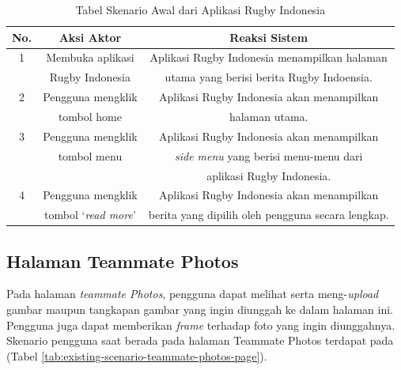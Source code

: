 \begin{table} [!h]
    \centering
    \caption{Tabel Skenario Awal dari Aplikasi Rugby Indonesia}
    \begin{tabular}{|c|c|c|}
    \hline
       No. & Aksi Aktor & Reaksi Sistem  \\ \hline
        1 & Membuka aplikasi & Aplikasi Rugby Indonesia menampilkan halaman \\
         & Rugby Indonesia & utama yang berisi berita Rugby Indoensia. \\ \hline
        2 & Pengguna mengklik & Aplikasi Rugby Indonesia akan menampilkan \\ 
         & tombol home &  halaman utama. \\ \hline
        3 & Pengguna mengklik & Aplikasi Rugby Indonesia akan menampilkan \\ 
         & tombol menu &  \textit{side menu} yang berisi menu-menu dari \\ 
         & &  aplikasi Rugby Indonesia. \\ \hline
        4 & Pengguna mengklik & Aplikasi Rugby Indonesia akan menampilkan \\
          & tombol `\textit{read more}' & berita yang dipilih oleh pengguna secara lengkap. \\ \hline
    \end{tabular}
    \label{tab:existing-scenario-welcome-page}
\end{table}

\subsection{Halaman Teammate Photos}

Pada halaman \textit{teammate Photos}, pengguna dapat melihat serta meng-\textit{upload} gambar maupun tangkapan gambar yang ingin diunggah ke dalam halaman ini. Pengguna juga dapat memberikan \textit{frame} terhadap foto yang ingin diunggahnya. Skenario pengguna saat berada pada halaman Teammate Photos terdapat pada (Tabel \ref{tab:existing-scenario-teammate-photos-page}).

